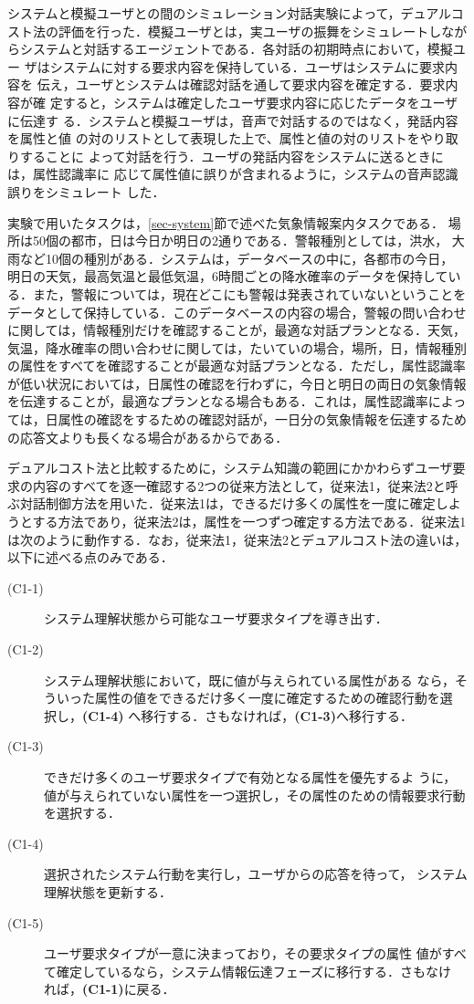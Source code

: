 システムと模擬ユーザとの間のシミュレーション対話実験によって，デュアルコ
スト法の評価を行った．模擬ユーザとは，実ユーザの振舞をシミュレートしなが
らシステムと対話するエージェントである．各対話の初期時点において，模擬ユー
ザはシステムに対する要求内容を保持している．ユーザはシステムに要求内容を
伝え，ユーザとシステムは確認対話を通して要求内容を確定する．要求内容が確
定すると，システムは確定したユーザ要求内容に応じたデータをユーザに伝達す
る．システムと模擬ユーザは，音声で対話するのではなく，発話内容を属性と値
の対のリストとして表現した上で、属性と値の対のリストをやり取りすることに
よって対話を行う．ユーザの発話内容をシステムに送るときには，属性認識率に
応じて属性値に誤りが含まれるように，システムの音声認識誤りをシミュレート
した．

実験で用いたタスクは，\ref{sec-system}節で述べた気象情報案内タスクである．
場所は50個の都市，日は今日か明日の2通りである．警報種別としては，洪水，
大雨など10個の種別がある．システムは，データベースの中に，各都市の今日，
明日の天気，最高気温と最低気温，6時間ごとの降水確率のデータを保持してい
る．また，警報については，現在どこにも警報は発表されていないということを
データとして保持している．このデータベースの内容の場合，警報の問い合わせ
に関しては，情報種別だけを確認することが，最適な対話プランとなる．天気，
気温，降水確率の問い合わせに関しては，たいていの場合，場所，日，情報種別
の属性をすべてを確認することが最適な対話プランとなる．ただし，属性認識率
が低い状況においては，日属性の確認を行わずに，今日と明日の両日の気象情報
を伝達することが，最適なプランとなる場合もある．これは，属性認識率によっ
ては，日属性の確認をするための確認対話が，一日分の気象情報を伝達するため
の応答文よりも長くなる場合があるからである．

デュアルコスト法と比較するために，システム知識の範囲にかかわらずユーザ要
求の内容のすべてを逐一確認する2つの従来方法として，従来法1，従来法2と呼
ぶ対話制御方法を用いた．従来法1は，できるだけ多くの属性を一度に確定しよ
うとする方法であり，従来法2は，属性を一つずつ確定する方法である．従来法1 
は次のように動作する．なお，従来法1，従来法2とデュアルコスト法の違いは，
以下に述べる点のみである．

\begin{description}
\item[(C1-1)] システム理解状態から可能なユーザ要求タイプを導き出す．
\item[(C1-2)] システム理解状態において，既に値が与えられている属性がある
なら，そういった属性の値をできるだけ多く一度に確定するための確認行動を選
択し，{\bf (C1-4)} へ移行する．さもなければ，{\bf (C1-3)}へ移行する．
\item[(C1-3)] できだけ多くのユーザ要求タイプで有効となる属性を優先するよ
うに，値が与えられていない属性を一つ選択し，その属性のための情報要求行動
を選択する．
\item[(C1-4)] 選択されたシステム行動を実行し，ユーザからの応答を待って，
システム理解状態を更新する．
\item[(C1-5)] ユーザ要求タイプが一意に決まっており，その要求タイプの属性
値がすべて確定しているなら，システム情報伝達フェーズに移行する．さもなけ
れば，{\bf (C1-1)}に戻る．
\end{description}

